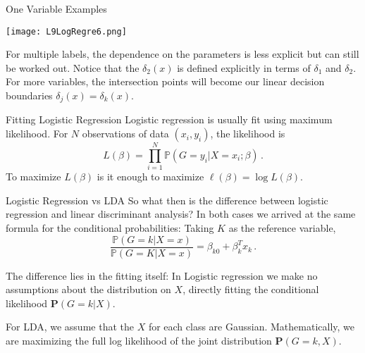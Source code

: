 \documentclass[10pt, table, dvipsnames,xcdraw, handout]{beamer}
\newcommand{\bP}{\ensuremath{\mathbb{P}}}
\begin{document}
\begin{frame}[fragile]{One Variable Examples}
  \begin{minipage}[t][0.5\textheight][t]{\textwidth}
	\centering \texttt{[image: L9LogRegre6.png]} 
  \end{minipage}
  \vfill
\begin{minipage}[t][0.5\textheight][t]{\textwidth}
For multiple labels, the dependence on the parameters is less explicit but can still be worked out. Notice that the $\delta_2(x)$ is defined explicitly in terms of $\delta_1$ and $\delta_2$. For more variables, the intersection points will become our linear decision boundaries $\delta_j(x) = \delta_k(x)$. 
\end{minipage}
\end{frame}



\begin{frame}[fragile]{Fitting Logistic Regression}
Logistic regression is usually fit using maximum likelihood. For $N$ observations of data $(x_i,y_i)$, the likelihood is
$$
L(\beta) = \prod_{i=1}^N \bP(G=y_i|X=x_i;\beta)\,.
$$\pause
To maximize $L(\beta)$ is it enough to maximize $\ell(\beta) = \log L(\beta)$. 
\end{frame}



\begin{frame}[fragile]{Logistic Regression vs LDA}
So what then is the difference between logistic regression and linear discriminant analysis? In both cases we arrived at the same formula for the conditional probabilities: Taking $K$ as the reference variable,
$$
\frac{\mathbb{P}(G = k| X = x)}{\mathbb{P}(G = K| X = x)} = \beta_{k0} + \beta_{k}^Tx_k\,.
$$\pause

The difference lies in the fitting itself: In Logistic regression we make no assumptions about the distribution on $X$, directly fitting the conditional likelihood $\mathbf{P}(G = k| X)$. \pause

For LDA, we assume that the $X$ for each class are Gaussian. Mathematically, we are maximizing the full log likelihood of the joint distribution $\mathbf{P}(G = k, X)$. 
\end{frame}
\end{document}
